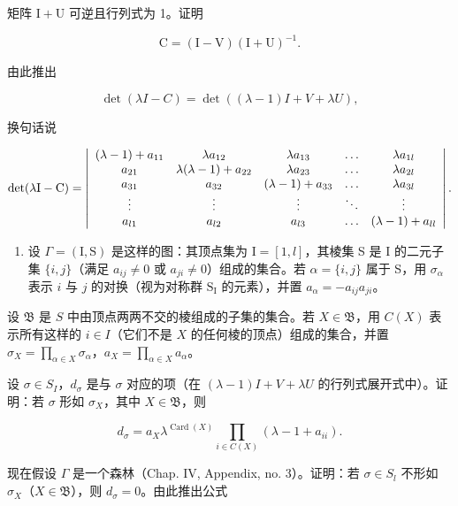 矩阵 \(\mathrm{I} + \mathrm{U}\) 可逆且行列式为 1。证明

\[
\mathrm{C} = (\mathrm{I} - \mathrm{V}) (\mathrm{I} + \mathrm{U}) ^ {- 1}.
\]

由此推出

\[
\det (\lambda I - C) = \det ((\lambda - 1) I + V + \lambda U),
\]

换句话说

\[
\det (\lambda \mathrm{I} - \mathrm{C}) = \left| \begin{array}{c c c c c} (\lambda - 1) + a _ {1 1} & \lambda a _ {1 2} & \lambda a _ {1 3} & \dots & \lambda a _ {1 l} \\ a _ {2 1} & \lambda (\lambda - 1) + a _ {2 2} & \lambda a _ {2 3} & \dots & \lambda a _ {2 l} \\ a _ {3 1} & a _ {3 2} & (\lambda - 1) + a _ {3 3} & \dots & \lambda a _ {3 l} \\ \vdots & \vdots & \vdots & \ddots & \vdots \\ a _ {l 1} & a _ {l 2} & a _ {l 3} & \dots & (\lambda - 1) + a _ {l l} \end{array} \right|.
\]

\begin{enumerate}
\def\labelenumi{\alph{enumi})}
\setcounter{enumi}{2}
\tightlist
\item
  设 \(\Gamma = (\mathrm{I},\mathrm{S})\) 是这样的图：其顶点集为 \(\mathrm{I} = [1,l]\)，其棱集 S 是 I 的二元子集 \(\{i,j\}\)（满足 \(a_{ij}\neq 0\) 或 \(a_{ji}\neq 0\)）组成的集合。若 \(\alpha = \{i,j\}\) 属于 S，用 \(\sigma_{\alpha}\) 表示 \(i\) 与 \(j\) 的对换（视为对称群 \(\mathrm{S_I}\) 的元素），并置 \(a_{\alpha} = -a_{ij}a_{ji}\)。
\end{enumerate}

设 \(\mathfrak{B}\) 是 \(S\) 中由顶点两两不交的棱组成的子集的集合。若 \(X \in \mathfrak{B}\)，用 \(C(X)\) 表示所有这样的 \(i \in I\)（它们不是 \(X\) 的任何棱的顶点）组成的集合，并置 \(\sigma_X = \prod_{\alpha \in X} \sigma_\alpha\)，\(a_X = \prod_{\alpha \in X} a_\alpha\)。

设 \(\sigma \in S_{I}\)，\(d_{\sigma}\) 是与 \(\sigma\) 对应的项（在 \((\lambda - 1)I + V + \lambda U\) 的行列式展开式中）。证明：若 \(\sigma\) 形如 \(\sigma_{X}\)，其中 \(X \in \mathfrak{B}\)，则

\[
d _ {\sigma} = a _ {X} \lambda^ {\operatorname{Card} (X)} \prod_ {i \in C (X)} (\lambda - 1 + a _ {i i}).
\]

现在假设 \(\Gamma\) 是一个森林（Chap. IV, Appendix, no. 3）。证明：若 \(\sigma \in S_l\) 不形如 \(\sigma_X\)（\(X \in \mathfrak{B}\)），则 \(d_{\sigma} = 0\)。由此推出公式

